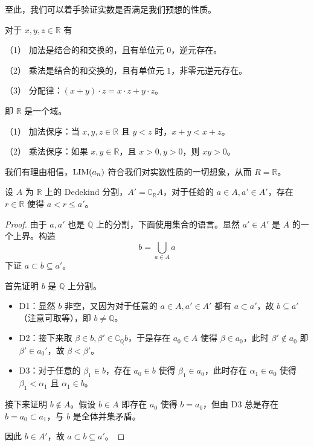 至此，我们可以着手验证实数是否满足我们预想的性质。

\begin{theorem}
	对于 $x,y,z\in \mathbb{R}$ 有

	（1） 加法是结合的和交换的，且有单位元 $0$，逆元存在。

	（2） 乘法是结合的和交换的，且有单位元 $1$，非零元逆元存在。

	（3） 分配律：$(x+y) \cdot  z = x \cdot z + y\cdot z$。
\end{theorem}

即 $\mathbb{R}$ 是一个域。

\begin{theorem}
	（1） 加法保序：当 $x,y,z\in \mathbb{R}$ 且 $y<z$ 时，$x+y<x+z$。

	（2） 乘法保序：如果 $x,y\in \mathbb{R}$，且 $x>0,y>0$，则 $xy>0$。
\end{theorem}

我们有理由相信，$\operatorname{{LIM}}(a_n)$ 符合我们对实数性质的一切想象，从而 $R = \mathbb{R}$。

\begin{theorem}[Dedekind 原理]
	设 $A$ 为 $\mathbb{R}$ 上的 Dedekind 分割，$A' = \complement_\mathbb{R} A$，对于任给的 $a\in A,a' \in A'$，存在 $r \in \mathbb{R}$ 使得 $a < r \leqslant a'$。
\end{theorem}

\begin{proof}
	由于 $a, a'$ 也是 $\mathbb{Q}$ 上的分割，下面使用集合的语言。显然 $a' \in A'$ 是 $A$ 的一个上界。构造
	\[ b = \bigcup_{a \in A} a \]
	下证 $a \subset b \subseteq a'$。

	首先证明 $b$ 是 $\mathbb{Q}$ 上分割。

	\begin{itemize}
		\item D1：显然 $b$ 非空，又因为对于任意的 $a \in A, a' \in A'$ 都有 $a \subset a'$，故 $b \subseteq a'$（注意可取等），即 $b \neq \mathbb{Q}$。
		\item D2：接下来取 $\beta \in b, \beta' \in \complement_\mathbb{Q} b$，于是存在 $a_0 \in A$ 使得 $\beta \in a_0$，此时 $\beta' \notin a_0$ 即 $\beta' \in a_0'$，故 $\beta < \beta'$。
		\item D3：对于任意的 $\beta_1 \in b$，存在 $a_0 \in b$ 使得 $\beta_1 \in a_0$，此时存在 $\alpha_1 \in a_0$ 使得 $\beta_1 < \alpha_1$ 且 $\alpha_1 \in b$。
	\end{itemize}


	接下来证明 $b \notin A$。假设 $b \in A$ 即存在 $a_0$ 使得 $b = a_0$，但由 D3 总是存在 $b = a_0 \subset a_1$，与 $b$ 是全体并集矛盾。

	因此 $b \in A'$，故 $a \subset b \subseteq a'$。
\end{proof}

